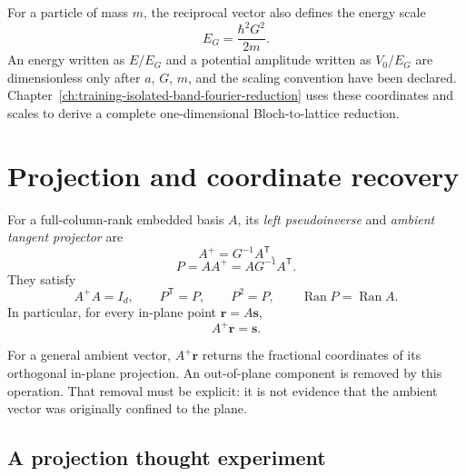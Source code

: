 For a particle of mass $m$, the reciprocal vector also defines the energy
scale
\begin{equation}
  E_G=\frac{\hbar^2G^2}{2m}.
  \label{eq:training-geometry-reciprocal-energy}
\end{equation}
An energy written as $E/E_G$ and a potential amplitude written as $V_0/E_G$
are dimensionless only after $a$, $G$, $m$, and the scaling convention have
been declared. Chapter~\ref{ch:training-isolated-band-fourier-reduction} uses
these coordinates and scales to derive a complete one-dimensional
Bloch-to-lattice reduction.

\section{Projection and coordinate recovery}

\begin{definition}
\label{def:training-left-pseudoinverse-projector}
For a full-column-rank embedded basis $A$, its \emph{left pseudoinverse} and
\emph{ambient tangent projector} are
\begin{equation}
  A^{+}=G^{-1}A^{\mathsf T}.
  \label{eq:training-left-pseudoinverse}
\end{equation}
\begin{equation}
  P=AA^{+}=AG^{-1}A^{\mathsf T}.
  \label{eq:training-ambient-projector}
\end{equation}
They satisfy
\begin{equation}
  A^{+}A=I_d,
  \qquad
  P^{\mathsf T}=P,
  \qquad
  P^2=P,
  \qquad
  \operatorname{Ran}P=\operatorname{Ran}A.
  \label{eq:training-projector-identities}
\end{equation}
In particular, for every in-plane point $\mathbf r=A\mathbf s$,
\begin{equation}
  A^{+}\mathbf r=\mathbf s.
  \label{eq:training-fractional-recovery}
\end{equation}
\end{definition}

For a general ambient vector, $A^{+}\mathbf r$ returns the fractional
coordinates of its orthogonal in-plane projection.
An out-of-plane component is removed by this operation. That removal must be
explicit: it is not evidence that the ambient vector was originally confined
to the plane.

\subsection{A projection thought experiment}

